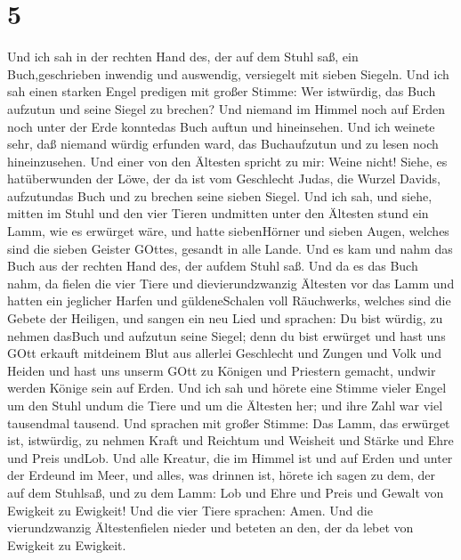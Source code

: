 \hypertarget{section-3}{%
\section{5}\label{section-3}}

 Und ich sah in der rechten Hand des, der auf dem Stuhl saß,
ein Buch,geschrieben inwendig und auswendig, versiegelt mit sieben
Siegeln.  Und ich sah einen starken Engel predigen mit
großer Stimme: Wer istwürdig, das Buch aufzutun und seine Siegel zu
brechen?  Und niemand im Himmel noch auf Erden noch unter
der Erde konntedas Buch auftun und hineinsehen.  Und ich
weinete sehr, daß niemand würdig erfunden ward, das Buchaufzutun und zu
lesen noch hineinzusehen.  Und einer von den Ältesten
spricht zu mir: Weine nicht! Siehe, es hatüberwunden der Löwe, der da
ist vom Geschlecht Judas, die Wurzel Davids, aufzutundas Buch und zu
brechen seine sieben Siegel.  Und ich sah, und siehe, mitten
im Stuhl und den vier Tieren undmitten unter den Ältesten stund ein
Lamm, wie es erwürget wäre, und hatte siebenHörner und sieben Augen,
welches sind die sieben Geister GOttes, gesandt in alle Lande.
 Und es kam und nahm das Buch aus der rechten Hand des, der
aufdem Stuhl saß.  Und da es das Buch nahm, da fielen die
vier Tiere und dievierundzwanzig Ältesten vor das Lamm und hatten ein
jeglicher Harfen und güldeneSchalen voll Räuchwerks, welches sind die
Gebete der Heiligen,  und sangen ein neu Lied und sprachen:
Du bist würdig, zu nehmen dasBuch und aufzutun seine Siegel; denn du
bist erwürget und hast uns GOtt erkauft mitdeinem Blut aus allerlei
Geschlecht und Zungen und Volk und Heiden  und hast uns
unserm GOtt zu Königen und Priestern gemacht, undwir werden Könige sein
auf Erden.  Und ich sah und hörete eine Stimme vieler Engel
um den Stuhl undum die Tiere und um die Ältesten her; und ihre Zahl war
viel tausendmal tausend.  Und sprachen mit großer Stimme:
Das Lamm, das erwürget ist, istwürdig, zu nehmen Kraft und Reichtum und
Weisheit und Stärke und Ehre und Preis undLob.  Und alle
Kreatur, die im Himmel ist und auf Erden und unter der Erdeund im Meer,
und alles, was drinnen ist, hörete ich sagen zu dem, der auf dem
Stuhlsaß, und zu dem Lamm: Lob und Ehre und Preis und Gewalt von
Ewigkeit zu Ewigkeit!  Und die vier Tiere sprachen: Amen.
Und die vierundzwanzig Ältestenfielen nieder und beteten an den, der da
lebet von Ewigkeit zu Ewigkeit.

